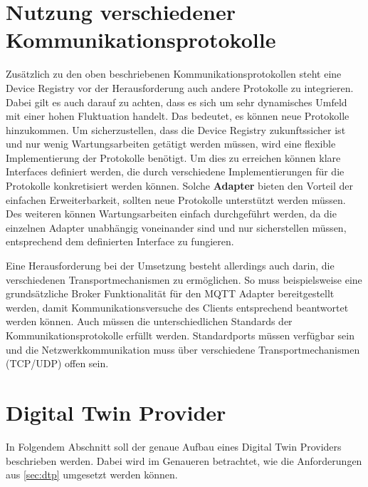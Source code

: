 \section{Nutzung verschiedener Kommunikationsprotokolle}

Zusätzlich zu den oben beschriebenen Kommunikationsprotokollen steht eine Device Registry vor der Herausforderung auch andere Protokolle zu integrieren. Dabei gilt es auch darauf zu achten, dass es sich um sehr dynamisches Umfeld mit einer hohen Fluktuation handelt. Das bedeutet, es können neue Protokolle hinzukommen. Um sicherzustellen, dass die Device Registry zukunftssicher ist und nur wenig Wartungsarbeiten getätigt werden müssen, wird eine flexible Implementierung der Protokolle benötigt. Um dies zu erreichen können klare Interfaces definiert werden, die durch verschiedene Implementierungen für die Protokolle konkretisiert werden können. Solche \textbf{Adapter} bieten den Vorteil der einfachen Erweiterbarkeit, sollten neue Protokolle unterstützt werden müssen. Des weiteren können Wartungsarbeiten einfach durchgeführt werden, da die einzelnen Adapter unabhängig voneinander sind und nur sicherstellen müssen, entsprechend dem definierten Interface zu fungieren.

Eine Herausforderung bei der Umsetzung besteht allerdings auch darin, die verschiedenen Transportmechanismen zu ermöglichen. So muss beispielsweise eine grundsätzliche Broker Funktionalität für den \ac{MQTT} Adapter bereitgestellt werden, damit Kommunikationsversuche des Clients entsprechend beantwortet werden können. Auch müssen die unterschiedlichen Standards der Kommunikationsprotokolle erfüllt werden. Standardports müssen verfügbar sein und die Netzwerkkommunikation muss über verschiedene Transportmechanismen (TCP/UDP) offen sein.



\section{Digital Twin Provider}

In Folgendem Abschnitt soll der genaue Aufbau eines Digital Twin Providers beschrieben werden. Dabei wird im Genaueren betrachtet, wie die Anforderungen aus \vref{sec:dtp} umgesetzt werden können.

